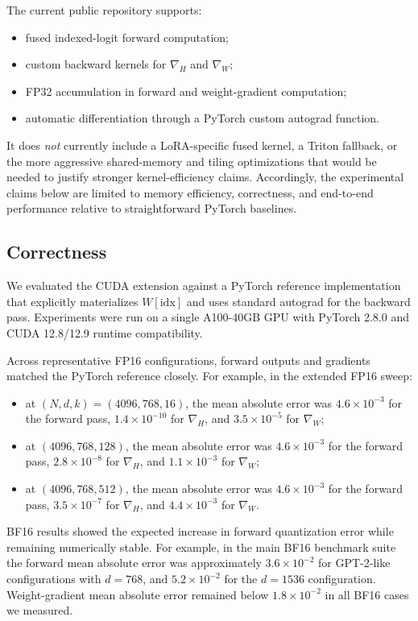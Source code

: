 The current public repository supports:
\begin{itemize}
\item fused indexed-logit forward computation;
\item custom backward kernels for $\nabla_H$ and $\nabla_W$;
\item FP32 accumulation in forward and weight-gradient computation;
\item automatic differentiation through a PyTorch custom autograd function.
\end{itemize}

It does \emph{not} currently include a LoRA-specific fused kernel, a Triton fallback, or the more aggressive shared-memory and tiling optimizations that would be needed to justify stronger kernel-efficiency claims. Accordingly, the experimental claims below are limited to memory efficiency, correctness, and end-to-end performance relative to straightforward PyTorch baselines.

\subsection{Correctness}

We evaluated the CUDA extension against a PyTorch reference implementation that explicitly materializes $W[\mathrm{idx}]$ and uses standard autograd for the backward pass. Experiments were run on a single A100-40GB GPU with PyTorch 2.8.0 and CUDA 12.8/12.9 runtime compatibility.

Across representative FP16 configurations, forward outputs and gradients matched the PyTorch reference closely. For example, in the extended FP16 sweep:
\begin{itemize}
\item at $(N,d,k)=(4096,768,16)$, the mean absolute error was $4.6\times 10^{-3}$ for the forward pass, $1.4\times 10^{-10}$ for $\nabla_H$, and $3.5\times 10^{-5}$ for $\nabla_W$;
\item at $(4096,768,128)$, the mean absolute error was $4.6\times 10^{-3}$ for the forward pass, $2.8\times 10^{-8}$ for $\nabla_H$, and $1.1\times 10^{-3}$ for $\nabla_W$;
\item at $(4096,768,512)$, the mean absolute error was $4.6\times 10^{-3}$ for the forward pass, $3.5\times 10^{-7}$ for $\nabla_H$, and $4.4\times 10^{-3}$ for $\nabla_W$.
\end{itemize}

BF16 results showed the expected increase in forward quantization error while remaining numerically stable. For example, in the main BF16 benchmark suite the forward mean absolute error was approximately $3.6\times 10^{-2}$ for GPT-2-like configurations with $d=768$, and $5.2\times 10^{-2}$ for the $d=1536$ configuration. Weight-gradient mean absolute error remained below $1.8\times 10^{-2}$ in all BF16 cases we measured.

